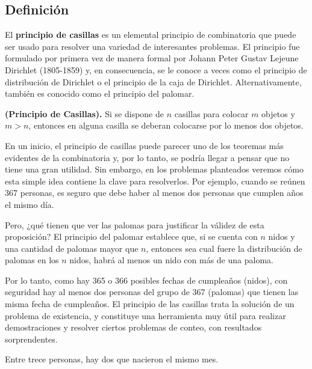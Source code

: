 \documentclass[12pt]{article}
\begin{document}
\subsection{Definición}

\begin{definicion}
    El \textbf{principio de casillas} es un elemental principio de combinatoria que puede  ser  usado  para  resolver  una  variedad  de  interesantes  problemas.  El  principio  fue  formulado  por  primera  vez  de  manera  formal por Johann Peter Gustav Lejeune Dirichlet (1805-1859) y, en consecuencia,  se  le conoce  a  veces  como  el  principio  de  distribución  de Dirichlet  o  el  principio  de  la  caja  de  Dirichlet. Alternativamente, también   es  conocido  como el principio  del palomar.
\end{definicion}

\begin{teorema}
    \textbf{(Principio de Casillas).} Si se dispone de $n$ casillas para colocar $m$ objetos y $m > n$, entonces en alguna casilla se deberan colocarse por lo menos dos objetos.
\end{teorema}

En un inicio, el principio de casillas puede parecer uno de los teoremas más evidentes de la combinatoria y, por lo tanto, se podría llegar a pensar que no tiene una gran utilidad. Sin embargo, en los problemas planteados veremos cómo esta simple idea contiene la clave para resolverlos. Por ejemplo, cuando se  reúnen 367 personas, es seguro que debe haber al menos dos personas que cumplen años el mismo día. 

Pero, ¿qué tienen que ver las palomas para justificar la  válidez de esta proposición? El principio del palomar establece que, si se cuenta con $n$ nidos y una cantidad de palomas mayor que $n$, entonces sea cual fuere la distribución de palomas en los $n$ nidos, habrá al menos un nido con más de una paloma.

Por lo tanto, como hay 365 o 366 posibles fechas de cumpleaños (nidos), con seguridad hay al menos dos personas del grupo de 367 (palomas) que tienen las misma fecha de cumpleaños. El principio de las casillas trata la solución de un problema de existencia, y constituye una herramienta muy útil para realizar demostraciones y resolver ciertos problemas de conteo, con resultados sorprendentes.

\begin{ejemplo}
    Entre trece personas, hay dos que nacieron el mismo mes.
\end{ejemplo}
\end{document}

